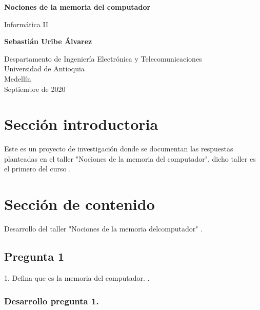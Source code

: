 \documentclass{article}
\begin{document}
\begin{titlepage}
    \begin{center}
        \vspace*{1cm}
            
        \Huge
        \textbf{Nociones de la memoria del computador}
            
        \vspace{0.5cm}
        \LARGE
        Informática II
            
        \vspace{1.5cm}
            
        \textbf{Sebastián Uribe Álvarez}
            
        \vfill
            
        \vspace{0.8cm}
            
        \Large
        Despartamento de Ingeniería Electrónica y Telecomunicaciones\\
        Universidad de Antioquia\\
        Medellín\\
        Septiembre de 2020
            
    \end{center}
\end{titlepage}

\tableofcontents

\section{Sección introductoria}
Este es un proyecto de investigación donde se documentan las respuestas planteadas en el taller "Nociones de la memoria del computador", dicho taller es el primero del curso .

\section{Sección de contenido} \label{contenido}

Desarrollo del taller "Nociones de la memoria delcomputador"
. \cite{refer}


\subsection{Pregunta 1}

1. Defina que es la memoria del computador.
. \cite{refer}
\subsubsection{Desarrollo pregunta 1.}
\end{document}
